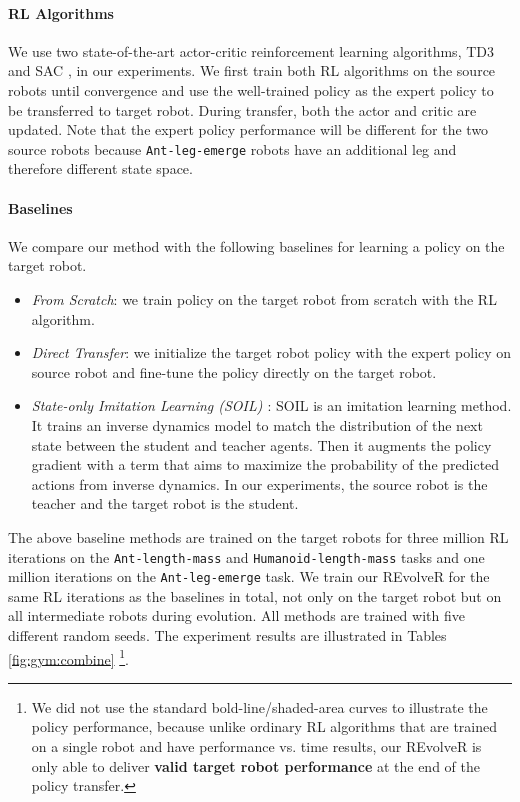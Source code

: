 \documentclass[nohyperref]{article}
\theoremstyle{plain}
\theoremstyle{definition}
\theoremstyle{remark}
\begin{document}
\paragraph{RL Algorithms} 
We use two state-of-the-art actor-critic reinforcement learning algorithms, TD3 \cite{td3} and SAC \cite{sac}, in our experiments.
We first train both RL algorithms on the source robots until convergence and use the well-trained policy as the expert policy to be transferred to target robot.
During transfer, both the actor and critic are updated.
Note that the expert policy performance will be different for the two source robots because \texttt{Ant-leg-emerge} robots have an additional leg and therefore different state space. 


\paragraph{Baselines} 
We compare our method with the following baselines for learning a policy on the target robot.
\begin{itemize}[leftmargin=3ex,topsep=0ex]
\setlength{\itemsep}{0pt}
\setlength{\parskip}{0pt}
\setlength{\parsep}{-100pt}
    \item \textit{From Scratch}: we train policy on the target robot from scratch with the RL algorithm.
    \item \textit{Direct Transfer}: we initialize the target robot policy with the expert policy on source robot and fine-tune the policy directly on the target robot.
    \item  \textit{State-only Imitation Learning (SOIL) \cite{soil}}:
    SOIL is an imitation learning method.
    It trains an inverse dynamics model to match the distribution of the next state between the student and teacher agents. 
    Then it augments the policy gradient with a term that aims to maximize the probability of the predicted actions from inverse dynamics.
    In our experiments, the source robot is the teacher and the target robot is the student.
\end{itemize}



The above baseline methods are trained on the target robots for three million RL iterations on the \texttt{Ant-length-mass} and \texttt{Humanoid-length-mass} tasks and one million iterations on the \texttt{Ant-leg-emerge} task.
We train our REvolveR for the same 
RL iterations as the baselines in total, not only on the target robot but on all intermediate robots during evolution.
All methods are trained with five different random seeds.
The experiment results are illustrated in Tables \ref{fig:gym:combine} \footnote{We did not use the standard bold-line/shaded-area curves to illustrate the policy performance, because unlike ordinary RL algorithms that are trained on a single robot and have performance vs. time results, our REvolveR is only able to deliver \textbf{valid target robot performance} at the end of the policy transfer. }.
\end{document}
